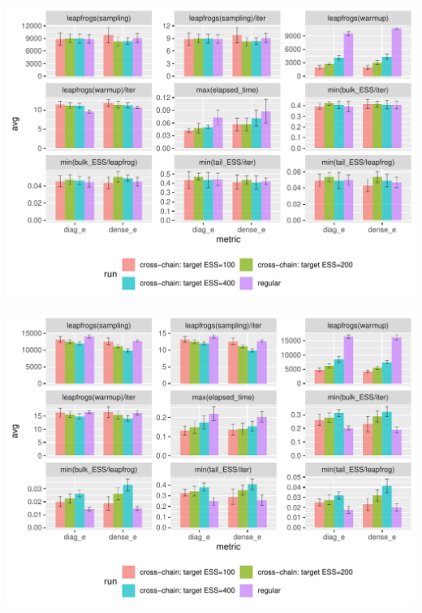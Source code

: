 \documentclass[landscape,a0paper,fontscale=0.45]{baposter} %
\newenvironment{ColFigure}
  {\par\medskip\noindent\minipage{\linewidth}}
  {\endminipage\par\medskip}
\begin{document}
\begin{poster}
{\begin{multicols}{2}
\begin{ColFigure}
\centering
\includegraphics[width=0.95\linewidth]{./figure/cross_chain_ess_effect_eight_schools.pdf}
\end{ColFigure}

\begin{ColFigure}
\centering
\includegraphics[width=0.95\linewidth]{./figure/cross_chain_ess_effect_sblrc-blr.pdf}
\end{ColFigure}


\end{multicols}}
\end{poster}
\end{document}
